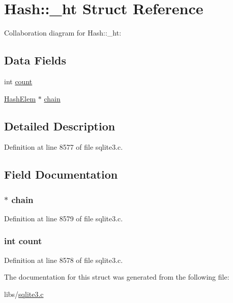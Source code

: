 \hypertarget{struct_hash_1_1__ht}{}\section{Hash\+:\+:\+\_\+ht Struct Reference}
\label{struct_hash_1_1__ht}


Collaboration diagram for Hash\+:\+:\+\_\+ht\+:
\subsection*{Data Fields}
\begin{DoxyCompactItemize}
\item 
int \hyperlink{struct_hash_1_1__ht_ad43c3812e6d13e0518d9f8b8f463ffcf}{count}
\item 
\hyperlink{struct_hash_elem}{Hash\+Elem} $\ast$ \hyperlink{struct_hash_1_1__ht_a4e5926fed05a6b42fdf7b1acfd61b29d}{chain}
\end{DoxyCompactItemize}


\subsection{Detailed Description}


Definition at line 8577 of file sqlite3.\+c.



\subsection{Field Documentation}
\hypertarget{struct_hash_1_1__ht_a4e5926fed05a6b42fdf7b1acfd61b29d}{}
\subsubsection[{chain}]{$\ast$ chain}\label{struct_hash_1_1__ht_a4e5926fed05a6b42fdf7b1acfd61b29d}


Definition at line 8579 of file sqlite3.\+c.

\hypertarget{struct_hash_1_1__ht_ad43c3812e6d13e0518d9f8b8f463ffcf}{}
\subsubsection[{count}]{\setlength{\rightskip}{0pt plus 5cm}int count}\label{struct_hash_1_1__ht_ad43c3812e6d13e0518d9f8b8f463ffcf}


Definition at line 8578 of file sqlite3.\+c.



The documentation for this struct was generated from the following file\+:\begin{DoxyCompactItemize}
\item 
libs/\hyperlink{sqlite3_8c}{sqlite3.\+c}\end{DoxyCompactItemize}
